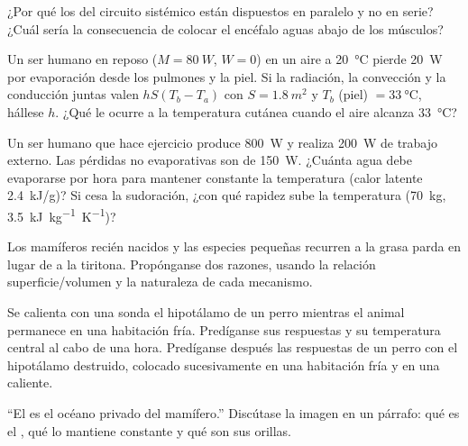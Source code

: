 \begin{exercise}[$\star\star$]\label{exo:b1:mammal-organization:7}
¿Por qué los  del circuito sistémico están dispuestos en paralelo y
no en serie? ¿Cuál sería la consecuencia de colocar el encéfalo aguas abajo
de los músculos?
\end{exercise}

\begin{exercise}[$\star\star$]\label{exo:b1:mammal-organization:8}
Un ser humano en reposo ($M = \qty{80}{W}$, $W = 0$) en un aire a
\qty{20}{\celsius} pierde \qty{20}{W} por evaporación desde los pulmones y
la piel. Si la radiación, la convección y la conducción juntas valen
$hS(T_b - T_a)$ con $S = \qty{1.8}{m^2}$ y $T_b$ (piel) $=
\qty{33}{\celsius}$, hállese $h$. ¿Qué le ocurre a la temperatura cutánea
cuando el aire alcanza \qty{33}{\celsius}?
\end{exercise}

\begin{exercise}[$\star\star$]\label{exo:b1:mammal-organization:9}
Un ser humano que hace ejercicio produce \qty{800}{W} y realiza
\qty{200}{W} de trabajo externo. Las pérdidas no evaporativas son de
\qty{150}{W}. ¿Cuánta agua debe evaporarse por hora para mantener constante
la temperatura (calor latente \qty{2.4}{kJ/g})? Si cesa la sudoración, ¿con
qué rapidez sube la temperatura (\qty{70}{kg},
\qty{3.5}{kJ.kg^{-1}.K^{-1}})?
\end{exercise}

\begin{exercise}[$\star\star\star$]\label{exo:b1:mammal-organization:10}
Los mamíferos recién nacidos y las especies pequeñas recurren a la grasa
parda en lugar de a la tiritona. Propónganse dos razones, usando la relación
superficie/volumen y la naturaleza de cada mecanismo.
\end{exercise}

\begin{exercise}[$\star\star\star$]\label{exo:b1:mammal-organization:11}
Se calienta con una sonda el hipotálamo de un perro mientras el animal
permanece en una habitación fría. Predíganse sus respuestas y su temperatura
central al cabo de una hora. Predíganse después las respuestas de un perro
con el hipotálamo destruido, colocado sucesivamente en una habitación fría y
en una caliente.
\end{exercise}

\begin{exercise}[$\star\star\star$]\label{exo:b1:mammal-organization:12}
``El  es el océano privado del mamífero.'' Discútase la imagen
en un párrafo: qué es el , qué lo mantiene constante y
qué  son sus orillas.
\end{exercise}

